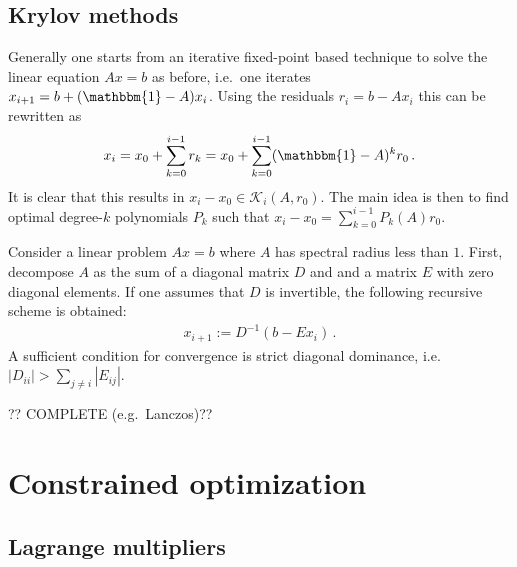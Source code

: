 \subsection{Krylov methods}

    Generally one starts from an iterative fixed-point based technique to solve the linear equation $Ax=b$ as before, i.e.~one iterates $x_{i+1} = b + (\mathbbm{1}-A)x_i$. Using the residuals $r_i = b - Ax_i$ this can be rewritten as
    \begin{gather}
        x_i = x_0 + \sum_{k=0}^{i-1}r_k = x_0 + \sum_{k=0}^{i-1}(\mathbbm{1}-A)^kr_0\,.
    \end{gather}
    It is clear that this results in $x_i-x_0\in\mathcal{K}_i(A,r_0)$. The main idea is then to find optimal degree-$k$ polynomials $P_k$ such that $x_i-x_0=\sum_{k=0}^{i-1}P_k(A)r_0$.

    \begin{method}
        Consider a linear problem $Ax=b$ where $A$ has spectral radius less than $1$. First, decompose $A$ as the sum of a diagonal matrix $D$ and and a matrix $E$ with zero diagonal elements. If one assumes that $D$ is invertible, the following recursive scheme is obtained:
        \begin{gather}
            x_{i+1} := D^{-1}(b-Ex_i)\,.
        \end{gather}
        A sufficient condition for convergence is strict diagonal dominance, i.e.~$|D_{ii}|>\sum_{j\neq i}|E_{ij}|$.
    \end{method}

    ?? COMPLETE (e.g.~Lanczos)??

\section{Constrained optimization}
\subsection{Lagrange multipliers}

